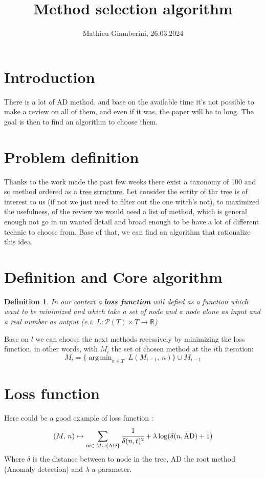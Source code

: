 \documentclass{article}
\title{Method selection algorithm}
\author{Mathieu Giamberini, 26.03.2024}
\date{}
\DeclareMathOperator*{\argmin}{arg\,min}
\newtheorem{definition}{Definition}
\begin{document}
    \maketitle
    \section*{Introduction}
        There is a lot of AD method, and base on the available time it's not possible to
        make a review on all of them, and even if it was, the paper will be to long. 
        The goal is then to find an algorithm to choose them.

    \section{Problem definition}
        Thanks to the work made the past few weeks there exist a taxonomy of 100 and so 
        method ordered as a \href{https://github.com/Mathieu-Giamberini/Anomalies_detection-literature_review/blob/main/3_Categorisation/tree.html}
        {tree structure}. Let consider the entity of thr tree is of interest to us 
        (if not we just need to filter out the one witch's not), to maximized the usefulness,
        of the review we would need a list of method, which is general enough not go in un wanted detail and 
        broad enough to be have a lot of different technic to choose from. Base of that, we can find an algorithm
        that rationalize this idea.

    \section{Definition and Core algorithm}
        \begin{definition}
            In our context a \textbf{loss function} will defied as a function which want to be minimized 
            and which take a set of node and a node alone as input and a real number as output 
            (e.i. $L: \mathcal{P} (T) \times T \to \mathbb{R} $) 
        \end{definition}
        Base on $l$ we can choose the next methods recessively by minimizing the loss function, in other words,
        with $M_i$ the set of chosen method at the $i$th iteration:
        \[M_i = \{\argmin_{n \in T} \; L(M_{i-1}, \,n)\} \cup M_{i-1}\]     
        
    \section{Loss function}
        Here could be a good example of loss function :
        \[(M, \,n) \mapsto \sum_{m \in \,M \cup \{\text{AD}\}} \cfrac{1}{\delta(n, t)^2} + \lambda \log(\delta(n, \text{AD}) + 1)\]
        Where $\delta$ is the distance between to node in the tree, AD the root method (Anomaly detection) and $\lambda$ a parameter. 
\end{document}

